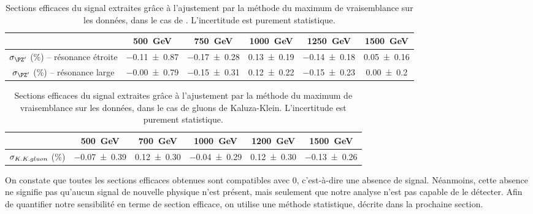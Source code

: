 \begin{table}[htbp] \centering

\begin{tabular}{@{}cccccc@{}} \toprule

 & \SI{500}{\GeV} & \SI{750}{\GeV} & \SI{1000}{\GeV} & \SI{1250}{\GeV} & \SI{1500}{\GeV} \\ \midrule
 $\sigma_{\zprime}$ (\si{\percent}) -- résonance étroite & \num{-0.11 \pm 0.87} & \num{-0.17 \pm 0.28} & \num{0.13 \pm 0.19} & \num{-0.14 \pm 0.18} & \num{0.05 \pm 0.16} \\
 $\sigma_{\zprime}$ (\si{\percent}) -- résonance large & \num{-0.00 \pm 0.79} & \num{-0.15 \pm 0.31} & \num{0.12 \pm 0.22} & \num{-0.15 \pm 0.23} & \num{0.00 \pm 0.2} \\ \bottomrule

\end{tabular}
\caption{Sections efficaces du signal extraites grâce à l'ajustement par la méthode du maximum de vraisemblance sur les données, dans le cas de \zprime. L'incertitude est purement statistique.}
\label{tab:cross_section_zprime}
\end{table}

\begin{table}[htbp] \centering

\begin{tabular}{@{}cccccc@{}} \toprule

 & \SI{500}{\GeV} & \SI{700}{\GeV} & \SI{1000}{\GeV} & \SI{1200}{\GeV} & \SI{1500}{\GeV} \\ \midrule
 $\sigma_{K. K. gluon}$ (\si{\percent}) & \num{-0.07 \pm 0.39} & \num{0.12 \pm 0.30} & \num{-0.04 \pm 0.29} & \num{0.12 \pm 0.30} & \num{-0.13 \pm 0.26} \\ \bottomrule
\end{tabular}
\caption{Sections efficaces du signal extraites grâce à l'ajustement par la méthode du maximum de vraisemblance sur les données, dans le cas de gluons de Kaluza-Klein. L'incertitude est purement statistique.}
\label{tab:cross_section_kk}
\end{table}

On constate que toutes les sections efficaces obtenues sont compatibles avec 0, c'est-à-dire une absence de signal. Néanmoins, cette absence ne signifie pas qu'aucun signal de nouvelle physique n'est présent, mais seulement que notre analyse n'est pas capable de le détecter. Afin de quantifier notre sensibilité en terme de section efficace, on utilise une méthode statistique, décrite dans la prochaine section.

